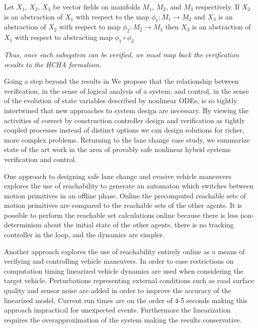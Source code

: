 \begin{prop}
	Let \(X_1\), \(X_2\), \(X_3\) be vector fields on manifolds \(M_1\), \(M_2\), and \(M_3\) respectively. If \(X_2\) is an abstraction of \(X_1\) with respect to the map \(\phi_1 : M_1 \rightarrow M_2\) and \(X_3\) is an abstraction of \(X_2\) with respect to map \(\phi_2 : M_2 \rightarrow M_3\) then \(X_3\) is an abstraction of \(X_1\) with respect to abstracting map \(\phi_1 \circ \phi_2\) \cite{Pappas1998}
\end{prop}

{\it Thus, once each subsystem can be verified, we must map back the verification results to the HCHA formalism.}

Going a step beyond the results in \cite{Pappas1998} We propose that the relationship between verification, in the sense of logical analysis of a system, and control, in the sense of the evolution of state variables described by nonlinear ODEs, is so tightly intertwined that new approaches to system design are necessary. By viewing the activities of correct by construction controller design and verification as tightly coupled processes instead of distinct options we can design solutions for richer, more complex problems. Returning to the lane change case study, we summarize state of the art work in the area of provably safe nonlinear hybrid systems verification and control.

One approach to designing safe lane change and evasive vehicle maneuvers explores the use of reachability to generate an automaton which switches between motion primitives in an offline phase. Online the precomputed reachable sets of motion primitives are compared to the reachable sets of the other agents. It is possible to perform the reachable set calculations online because there is less non-determinism about the initial state of the other agents, there is no tracking controller in the loop, and the dynamics are simpler.\cite{Hess2014}

Another approach explores the use of reachability entirely online as a means of verifying and controlling vehicle maneuvers. In order to ease restrictions on computation timing linearized vehicle dynamics are used when considering the target vehicle. Perturbations representing external conditions such as road surface quality and sensor noise are added in order to improve the accuracy of the linearized model. Current run times are on the order of 4-5 seconds making this approach impractical for unexpected events. Furthermore the linearization requires the overapproximation of the system making the results conservative.\cite{Althoff2014b}


